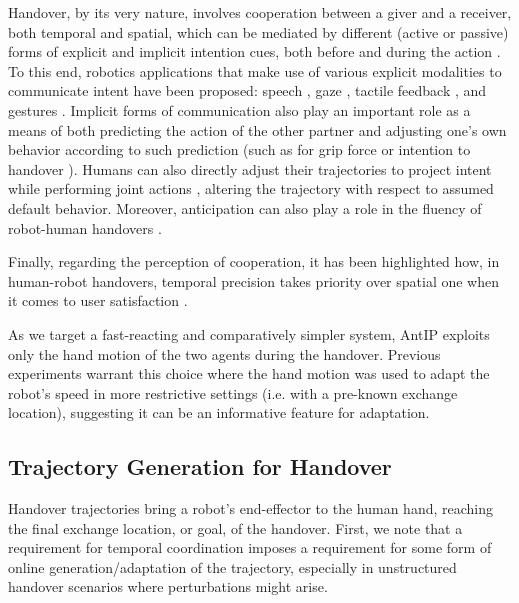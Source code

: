 \documentclass[lettersize,journal]{IEEEtran}
\begin{document}
\noindent
Handover, by its very nature, involves cooperation between a giver and a receiver, both temporal and spatial, which can be mediated by different (active or passive) forms of explicit and implicit intention cues, both before and during the action \cite{ortenzi_object_2021}.
To this end, robotics applications that make use of various explicit modalities to communicate intent have been proposed: speech \cite{foster_human-robot_2006}, gaze \cite{foster_human-robot_2006}\cite{moon_meet_2014}, tactile feedback \cite{cini_relevance_2021}, and gestures \cite{cakmak_using_2011}.
Implicit forms of communication also play an important role as a means of both predicting the action of the other partner and adjusting one's own behavior according to such prediction (such as for grip force \cite{controzzi_humans_2018} or intention to handover \cite{huber_spatiotemporal_2013} \cite{pan_automated_2017}).
Humans can also directly adjust their trajectories to project intent while performing joint actions \cite{pezzulo_human_2013}, altering the trajectory with respect to assumed default behavior.
Moreover, anticipation can also play a role in the fluency of robot-human handovers \cite{cakmak_using_2011}.

Finally, regarding the perception of cooperation, it has been highlighted how, in human-robot handovers, temporal precision takes priority over spatial one when it comes to user satisfaction \cite{koene_relative_2014}.

As we target a fast-reacting and comparatively simpler system, AntIP exploits only the hand motion of the two agents during the handover.
Previous experiments warrant this choice \cite{iori_dmp-based_2023} \cite{perovic_adaptive_2023} where the hand motion was used to adapt the robot's speed in more restrictive settings (i.e. with a pre-known exchange location), suggesting it can be an informative feature for adaptation.

\subsection{Trajectory Generation for Handover}
\label{subsec:rw:trajectory}

\noindent
Handover trajectories bring a robot's end-effector to the human hand, reaching the final exchange location, or goal, of the handover.
First, we note that a requirement for temporal coordination imposes a requirement for some form of online generation/adaptation of the trajectory, especially in unstructured handover scenarios where perturbations might arise.
\end{document}
